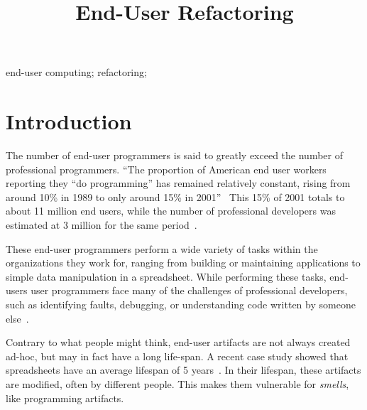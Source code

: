 \documentclass[10pt,conference,compsocconf]{IEEEtran}
\begin{document}
%
\title{End-User Refactoring}

\author{


\and
{}
}

\maketitle

\begin{abstract}
\end{abstract}


\begin{IEEEkeywords}
end-user computing; refactoring; 
\end{IEEEkeywords}

\section{Introduction}
The number of end-user programmers is said to greatly exceed the number of professional programmers. ``The proportion of American end user workers reporting they “do programming” has remained relatively constant, rising from around 10\% in 1989 to only around 15\% in 2001''~\cite{Scaf2005} This 15\% of 2001 totals to about 11 million end users, while the number of professional developers was estimated at 3 million for the same period~\cite{Scaf2005}.

These end-user programmers perform a wide variety of tasks within the organizations they work for, ranging from building or maintaining applications to simple data manipulation in a spreadsheet. While performing these tasks, end-users user programmers face many of the challenges of professional developers, such as identifying faults, debugging, or understanding code written by someone else~\cite{Ko2011}.

Contrary to what people might think, end-user artifacts are not always created ad-hoc, but may in fact have a long life-span. A recent case study showed that spreadsheets have an average lifespan of 5 years~\cite{Hermans2011}. In their lifespan, these artifacts are modified, often by different people. This makes them vulnerable for \emph{smells}, like programming artifacts. 
\end{document}
